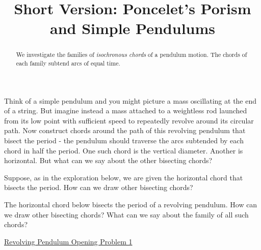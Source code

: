\documentclass{ximera}
\title{Short Version: Poncelet's Porism and Simple Pendulums}
\begin{document}
\begin{abstract}
We investigate the families of \emph{isochronous chords} of a pendulum motion. The chords of each family subtend arcs of equal time.
\end{abstract}
\maketitle



Think of a simple pendulum and you might picture a mass oscillating at the end of a string. But imagine instead a mass attached to a weightless rod launched from its low point with sufficient speed to repeatedly revolve around its circular path. Now construct chords around the path of this revolving pendulum that bisect the period - the pendulum should traverse the arcs subtended by each chord in half the period. One such chord is the vertical diameter. Another is horizontal. But what can we say about the other bisecting chords?

Suppose, as in the exploration below, we are given the horizontal chord that bisects the period. How can we draw other bisecting chords?

\begin{exploration}
The horizontal chord below bisects the period of a revolving pendulum. How can we draw other bisecting chords? What can we say about the family of all such chords?

\begin{onlineOnly}
    \begin{center}
\end{center}
\end{onlineOnly}

\href{https://www.desmos.com/calculator/x5fzsfvxdb}{Revolving Pendulum Opening Problem 1}

\end{exploration}
\end{document}
